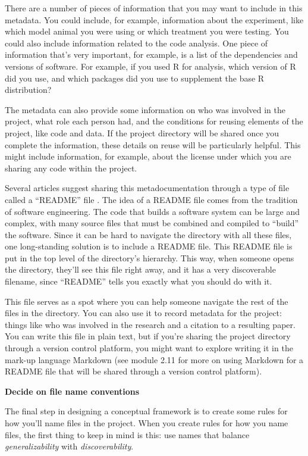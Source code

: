 \documentclass[]{tufte-book}
\begin{document}
There are a number of pieces of information that you may want to include in this
metadata. You could include, for example, information about the experiment, like
which model animal you were using or which treatment you were testing. You could
also include information related to the code analysis. One piece of information
that's very important, for example, is a list of the dependencies and versions
of software. For example, if you used R for analysis, which version of R did you
use, and which packages did you use to supplement the base R distribution?

The metadata can also provide some information on who was involved
in the project, what role each person had, and the conditions for reusing
elements of the project, like code and data. If the project directory will
be shared once you complete the information, these details on reuse will be
particularly helpful. This might include information, for example, about the
license under which you are sharing any code within the project.

Several articles suggest sharing this metadocumentation through a type of file
called a ``README'' file \citep{marwick2018packaging, bertin2021creating, prodigenr}.
The idea of a README file comes from the tradition of software engineering.
The code that builds a software system can be large and complex, with many
source files that must be combined and compiled to ``build'' the software.
Since it can be hard to navigate the directory with all these files, one
long-standing solution is to include a README file. This README file is
put in the top level of the directory's hierarchy. This way, when someone opens
the directory, they'll see this file right away, and it has a very discoverable
filename, since ``README'' tells you exactly what you should do with it.

This file serves as a spot where you can help someone navigate the rest of the
files in the directory. You can also use it to record metadata for the project:
things like who was involved in the research and a citation to a resulting
paper. You can write this file in plain text, but if you're sharing the project
directory through a version control platform, you might want to explore
writing it in the mark-up language Markdown (see module 2.11 for more on
using Markdown for a README file that will be shared through a version control
platform).

\textbf{Decide on file name conventions}

The final step in designing a conceptual framework is to create some rules for
how you'll name files in the project. When you create rules for how you name
files, the first thing to keep in mind is this: use names that balance
\emph{generalizability} with \emph{discoverability}.
\end{document}
